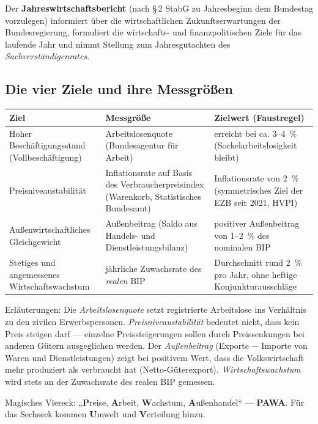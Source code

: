 \documentclass[11pt, a4paper]{article}
\begin{document}
Der \textbf{Jahreswirtschaftsbericht} (nach \S\,2 StabG zu Jahresbeginn dem Bundestag
vorzulegen) informiert über die wirtschaftlichen Zukunftserwartungen der Bundesregierung,
formuliert die wirtschafts- und finanzpolitischen Ziele für das laufende Jahr und nimmt
Stellung zum Jahresgutachten des \emph{Sachverständigenrates}.

\subsection{Die vier Ziele und ihre Messgrößen}

\begin{center}
\begin{tabular}{p{4.2cm} p{4.6cm} p{5.4cm}}
\toprule
\textbf{Ziel} & \textbf{Messgröße} & \textbf{Zielwert (Faustregel)}\\
\midrule
Hoher Beschäftigungsstand (Vollbeschäftigung) & Arbeitslosenquote (Bundesagentur für Arbeit) & erreicht bei ca. 3--4~\% (Sockelarbeitslosigkeit bleibt)\\
Preisniveaustabilität & Inflationsrate auf Basis des Verbraucherpreisindex (Warenkorb, Statistisches Bundesamt) & Inflationsrate von 2~\% (symmetrisches Ziel der EZB seit 2021, HVPI)\\
Außenwirtschaftliches Gleichgewicht & Außenbeitrag (Saldo aus Handels- und Dienstleistungsbilanz) & positiver Außenbeitrag von 1--2~\% des nominalen BIP\\
Stetiges und angemessenes Wirtschaftswachstum & jährliche Zuwachsrate des \emph{realen} BIP & Durchschnitt rund 2~\% pro Jahr, ohne heftige Konjunkturausschläge\\
\bottomrule
\end{tabular}
\end{center}

Erläuterungen: Die \emph{Arbeitslosenquote} setzt registrierte Arbeitslose ins Verhältnis
zu den zivilen Erwerbspersonen. \emph{Preisniveaustabilität} bedeutet nicht, dass kein
Preis steigen darf --- einzelne Preissteigerungen sollen durch Preissenkungen bei anderen
Gütern ausgeglichen werden. Der \emph{Außenbeitrag} (Exporte $-$ Importe von Waren und
Dienstleistungen) zeigt bei positivem Wert, dass die Volkswirtschaft mehr produziert als
verbraucht hat (Netto-Güterexport). \emph{Wirtschaftswachstum} wird stets an der
Zuwachsrate des realen BIP gemessen.

\begin{eselsbruecke}
Magisches Viereck: „\textbf{P}reise, \textbf{A}rbeit, \textbf{W}achstum,
\textbf{A}ußenhandel`` --- \textbf{PAWA}. Für das Sechseck kommen \textbf{U}mwelt und
\textbf{V}erteilung hinzu.
\end{eselsbruecke}
\end{document}
